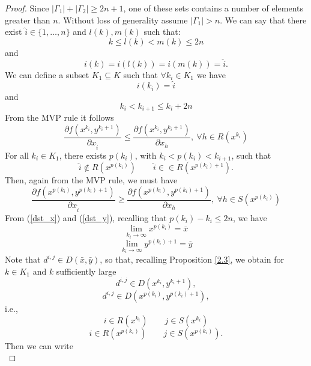 \begin{proof}
Since $|\Gamma_1|+|\Gamma_2|\ge 2n+1$, one of these sets contains a number of elements greater than $n$. 
Without loss of generality assume $|\Gamma_1|> n$.
We can say that there exist $ \hat i \in \{1,\ldots,n\}$ and $l(k),m(k)$ such that:
 \begin{equation}
  k\le l(k) <m(k)\le 2 n
 \end{equation}
and
\begin{equation}
 i(k) = i(l(k))=i(m(k))=\hat i.
\end{equation}
We can define a subset $K_1 \subseteq K$ such that $\forall k_i \in K_1$ we have
\begin{equation}
 i(k_i)=\hat i
\end{equation}
and
\begin{equation}
 k_i <k_{i+1} \le k_i+2n
\end{equation}
From the MVP rule it follows
\begin{equation}
 \frac{\partial f(x^{k_i},y^{k_i+1})}{\partial x_{\hat i}} \le \frac{\partial f(x^{k_i},y^{k_i+1})}{\partial x_{h}}, \ \forall h \in R(x^{k_i})
\end{equation}
For all $k_i \in K_1$, there exists $p(k_i)$, with  $k_i <p(k_i)<k_{i+1}$, such that
\begin{equation}
 \hat i \not \in R(x^{p(k_i)})\quad\quad \hat i \in \in R(x^{p(k_i)+1}).
\end{equation}
Then, again from the MVP rule, we must have
\begin{equation}
 \frac{\partial f(x^{p(k_i)},y^{p(k_i)+1})}{\partial x_{\hat i}} \ge \frac{\partial f(x^{p(k_i)},y^{p(k_i)+1})}{\partial x_{h}}, \ \forall h \in S(x^{p(k_i)})
\end{equation}
From (\ref{dst_x}) and (\ref{dst_y}), recalling that  $p(k_i)-k_i \le 2n$, we have
$$
 \lim_{k_i\rightarrow \infty} x^{p(k_i)}=\overline{x}
$$
$$
 \lim_{k_i\rightarrow \infty} y^{p(k_i)+1}=\overline{y}
$$
Note that $d^{i,j}\in D(\bar x,\bar y)$, so that, recalling Proposition \ref{2.3}, we obtain for
$k\in K_1$ and $k$ sufficiently large
\begin{equation}\label{dij_dka}
 d^{i,j}\in D(x^{k_i},y^{k_i+1}),
\end{equation}
\begin{equation}\label{dij_dkbis}
 d^{i,j}\in D(x^{p(k_i)},y^{p(k_i)+1}),
\end{equation}
i.e.,
$$
i\in R(x^{k_i})\quad\quad j\in S(x^{k_i})
$$ 
$$
i\in R(x^{p(k_i)})\quad\quad j\in S(x^{p(k_i)}).
$$
Then  we can write
\begin{equation}\label{eq:direction1}

\end{equation}
\end{proof}
